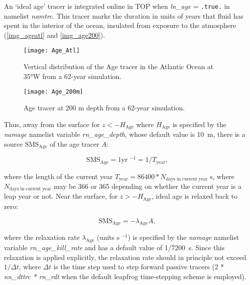 \documentclass[../main/TOP_manual]{subfiles}
\begin{document}
An `ideal age' tracer is integrated online in TOP when \textit{ln\_age} = \texttt{.true.} in namelist \textit{namtrc}.
This tracer marks the duration in units of years that fluid has spent in the interior of the ocean, insulated from exposure to the atmosphere  (\autoref{img_ageatl} and \autoref{img_age200}).

\begin{figure}[!h]
	\centering
	\texttt{[image: Age\_Atl]}
	\caption{Vertical distribution of the Age tracer in the Atlantic Ocean at 35°W from a 62-year simulation.}
	\label{img_ageatl}
\end{figure}

\begin{figure}[!h]
	\centering
	\texttt{[image: Age\_200m]}
	\caption{Age tracer at 200 m depth from a 62-year simulation.}
	\label{img_age200}
\end{figure}

Thus, away from the surface for $z<-H_{\mathrm{Age}}$ where $H_{\mathrm{Age}}$ is specified by the \textit{namage} namelist variable \textit{rn\_age\_depth}, whose default value is 10~m, there is a source $\mathrm{SMS_{\mathrm{Age}}}$ of the age tracer $A$:

\begin{equation}
  \label{eq:TOP-age-interior}
  \mathrm{SMS_{\mathrm{Age}}} = 1 \mathrm{yr}\;^{-1} = 1/T_{\mathrm{year}},
\end{equation}

where the length of the current year $T_{\mathrm{year}} = 86400*N_{\mathrm{days\;in\;current\; year}}\;\mathrm{s}$, where $N_{\mathrm{days\;in\;current\; year}}$ may be 366 or 365 depending on whether the current year is a leap year or not.
Near the surface, for $z>-H_{\mathrm{Age}}$, ideal age is relaxed back to zero:

\begin{equation}
  \label{eq:TOP-age-surface}
   \mathrm{SMS_{\mathrm{Age}}} = -\lambda_{\mathrm{Age}}A,
\end{equation}

where the relaxation rate $\lambda_{\mathrm{Age}}$  (units $\mathrm{s}\;^{-1}$) is specified by the \textit{namage} namelist variable \textit{rn\_age\_kill\_rate} and has a default value of 1/7200~s.
Since this relaxation is applied explicitly, the relaxation rate should in principle not exceed $1/\Delta t$, where $\Delta t$ is the time step used to step forward passive tracers (2 * \textit{nn\_dttrc * rn\_rdt} when the default  leapfrog time-stepping scheme is employed).
\end{document}
